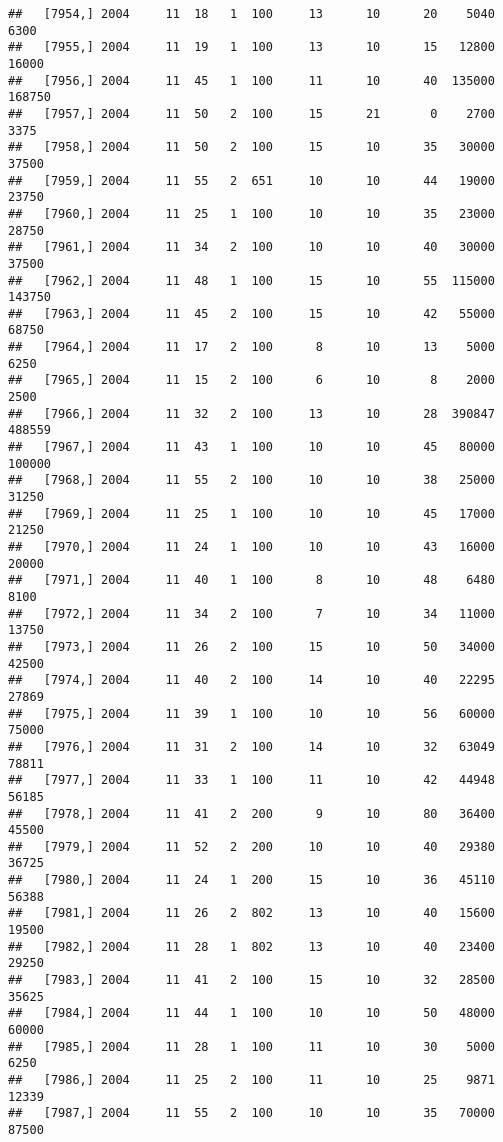 \documentclass{article}\usepackage[]{graphicx}\usepackage[]{color}
\makeatletter
\newenvironment{kframe}{%
 \def\at@end@of@kframe{}%
 \ifinner\ifhmode%
  \def\at@end@of@kframe{\end{minipage}}%
  \begin{minipage}{\columnwidth}%
 \fi\fi%
 \def\FrameCommand##1{\hskip\@totalleftmargin \hskip-\fboxsep
 \colorbox{shadecolor}{##1}\hskip-\fboxsep
     \hskip-\linewidth \hskip-\@totalleftmargin \hskip\columnwidth}%
 \MakeFramed {\advance\hsize-\width
   \@totalleftmargin\z@ \linewidth\hsize
   \@setminipage}}%
 {\par\unskip\endMakeFramed%
 \at@end@of@kframe}
\newenvironment{knitrout}{}{} %
\makeatother
\begin{document}
\begin{knitrout}
\begin{kframe}
\begin{verbatim}
##   [7954,] 2004     11  18   1  100     13      10      20    5040    6300
##   [7955,] 2004     11  19   1  100     13      10      15   12800   16000
##   [7956,] 2004     11  45   1  100     11      10      40  135000  168750
##   [7957,] 2004     11  50   2  100     15      21       0    2700    3375
##   [7958,] 2004     11  50   2  100     15      10      35   30000   37500
##   [7959,] 2004     11  55   2  651     10      10      44   19000   23750
##   [7960,] 2004     11  25   1  100     10      10      35   23000   28750
##   [7961,] 2004     11  34   2  100     10      10      40   30000   37500
##   [7962,] 2004     11  48   1  100     15      10      55  115000  143750
##   [7963,] 2004     11  45   2  100     15      10      42   55000   68750
##   [7964,] 2004     11  17   2  100      8      10      13    5000    6250
##   [7965,] 2004     11  15   2  100      6      10       8    2000    2500
##   [7966,] 2004     11  32   2  100     13      10      28  390847  488559
##   [7967,] 2004     11  43   1  100     10      10      45   80000  100000
##   [7968,] 2004     11  55   2  100     10      10      38   25000   31250
##   [7969,] 2004     11  25   1  100     10      10      45   17000   21250
##   [7970,] 2004     11  24   1  100     10      10      43   16000   20000
##   [7971,] 2004     11  40   1  100      8      10      48    6480    8100
##   [7972,] 2004     11  34   2  100      7      10      34   11000   13750
##   [7973,] 2004     11  26   2  100     15      10      50   34000   42500
##   [7974,] 2004     11  40   2  100     14      10      40   22295   27869
##   [7975,] 2004     11  39   1  100     10      10      56   60000   75000
##   [7976,] 2004     11  31   2  100     14      10      32   63049   78811
##   [7977,] 2004     11  33   1  100     11      10      42   44948   56185
##   [7978,] 2004     11  41   2  200      9      10      80   36400   45500
##   [7979,] 2004     11  52   2  200     10      10      40   29380   36725
##   [7980,] 2004     11  24   1  200     15      10      36   45110   56388
##   [7981,] 2004     11  26   2  802     13      10      40   15600   19500
##   [7982,] 2004     11  28   1  802     13      10      40   23400   29250
##   [7983,] 2004     11  41   2  100     15      10      32   28500   35625
##   [7984,] 2004     11  44   1  100     10      10      50   48000   60000
##   [7985,] 2004     11  28   1  100     11      10      30    5000    6250
##   [7986,] 2004     11  25   2  100     11      10      25    9871   12339
##   [7987,] 2004     11  55   2  100     10      10      35   70000   87500

\end{verbatim}
\end{kframe}
\end{knitrout}
\end{document}
